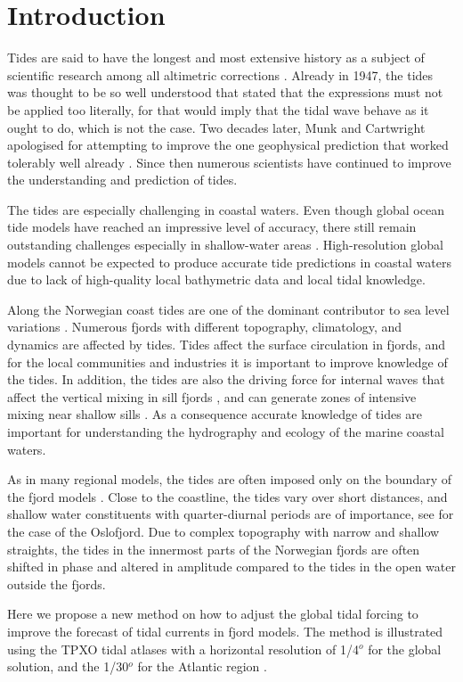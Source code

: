 \section{Introduction}

Tides are said to have the longest and most extensive history as a subject of scientific research among all altimetric corrections \cite[]{egbert94,cartwright77,hendershott81}. Already in 1947, the tides was thought to be so well understood that \cite{unna47} stated that the expressions must not be applied too literally, for that would imply that the tidal wave behave as it ought to do, which is not the case. Two decades later, Munk and Cartwright apologised for attempting to improve the one geophysical prediction that worked tolerably well already \cite[]{munk66}. Since then numerous scientists have continued to improve the understanding and prediction of tides. 

The tides are especially challenging in coastal waters. Even though global ocean tide models have reached an impressive level of accuracy, there still remain outstanding challenges especially in shallow-water areas \cite[]{stammer14}. 
High-resolution global models cannot be expected to produce accurate tide predictions in coastal waters due to lack of high-quality local bathymetric data and local tidal knowledge. 

Along the Norwegian coast tides are one of the dominant contributor to sea level variations \cite[]{grabbe09}. Numerous fjords with different topography, climatology, and dynamics are affected by tides. Tides affect the surface circulation in fjords, and for the local communities and industries it is important to improve knowledge of the tides. In addition, the tides are also the driving force for internal waves that affect the vertical mixing in sill fjords \cite[]{stigeb76}, and can generate zones of intensive mixing near shallow sills \cite[]{staal15}. As a consequence accurate knowledge of tides are important for understanding the hydrography and ecology of the marine coastal waters.

As in many regional models, the tides are often imposed only on the boundary of the fjord models \cite[]{gjevik89,carniello05,lynge13}. Close to the coastline, the tides vary over short distances, and shallow water constituents with quarter-diurnal periods are of importance, see \cite{trygg74} for the case of the Oslofjord. Due to complex topography with narrow and shallow straights, 
the tides in the innermost parts of the Norwegian fjords are often shifted in phase and altered in amplitude compared to the tides in the open water outside the fjords. 

Here we propose a new method on how to adjust the global tidal forcing to improve the forecast of tidal currents in fjord models. The method is illustrated using the TPXO tidal atlases with a horizontal resolution of 1/4$^o$ for the global solution, and the 1/30$^o$ for the Atlantic region \cite[]{egbert94,egbert02}. 
